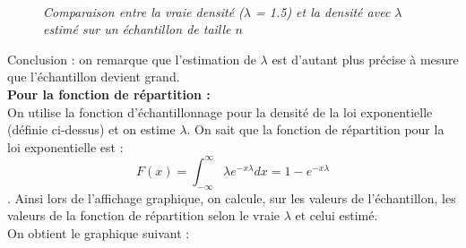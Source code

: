 \documentclass{article}      %
\begin{document}
\begin{figure}[H]
	\centering
	\\
	\textit{Comparaison entre la vraie densité ($\lambda$ = 1.5) et la densité avec $\lambda$ estimé sur un échantillon de taille $n$}
\end{figure}

Conclusion : on remarque que l'estimation de $\lambda$ est d'autant plus précise à mesure que l’échantillon devient grand.\\
\newline
\textbf{Pour la fonction de répartition :}\\

On utilise la fonction d’échantillonnage pour la densité de la loi exponentielle (définie ci-dessus) et on estime $\lambda$. On sait que la fonction de répartition pour la loi exponentielle est : $$F(x) = \int_{-\infty}^{\infty} \lambda e^{-x\lambda}dx = 1 - e^{-x\lambda}$$.
Ainsi lors de l'affichage graphique, on calcule, sur les valeurs de l'échantillon, les valeurs de la fonction de répartition selon le vraie $\lambda$ et celui estimé.\\
On obtient le graphique suivant :\\
\end{document}
